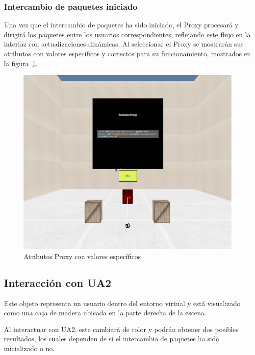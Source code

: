 \documentclass[a4paper, 12pt]{book}
\begin{document}
\subsubsection{Intercambio de paquetes iniciado}
\label{subsubsec:Proxy_Intercambio_Iniciado}
Una vez que el intercambio de paquetes ha sido iniciado, el Proxy procesará y dirigirá los paquetes entre los usuarios correspondientes, 
reflejando este flujo en la interfaz con actualizaciones dinámicas. Al seleccionar el Proxy se mostrarán sus atributos con valores específicos 
y correctos para su funcionamiento, mostrados en la figura~\ref{fig:Proxy_Iniciado}.

\begin{figure}
  \centering
  \includegraphics[width=15cm, keepaspectratio]{img/resultados/Proxy_Iniciado.png}
  \caption{Atributos Proxy con valores específicos}
  \label{fig:Proxy_Iniciado}
\end{figure}


\subsection{Interacción con UA2}
\label{subsec:objeto_ua1}

Este objeto representa un usuario dentro del entorno virtual y está visualizado como una caja 
de madera ubicada en la parte derecha de la escena.

Al interactuar con UA2, este cambiará de color y podrán obtener dos posibles resultados, los cuales dependen 
de si el intercambio de paquetes ha sido inicializado o no.
\end{document}
